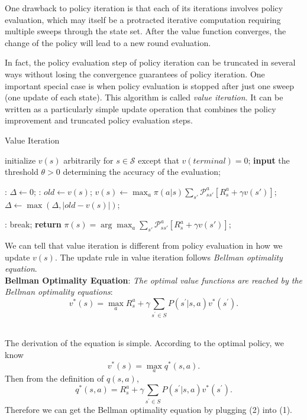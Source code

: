 \documentclass{progartcn}
\begin{document}
		One drawback to policy iteration is that each of its iterations involves policy evaluation, which may itself be a protracted iterative computation requiring multiple sweeps through the state set. After the value function converges, the change of the policy will lead to a new round evaluation.

		In fact, the policy evaluation step of policy iteration can be truncated in several ways without losing the convergence guarantees of policy iteration. One important special case is when policy evaluation is stopped after just one sweep (one update of each state). This algorithm is called \textit{value iteration}. It can be written as a particularly simple update operation that combines the policy improvement and truncated policy evaluation steps.

		\begin{algorithm}[H]
		\caption{Value Iteration}
		\label{alg: Value Iteration}
		\begin{algorithmic}[1]
		\State initialize $v(s)$ arbitrarily for $s\in\mathcal{S}$ except that $v(terminal)=0$;
        \State \textbf{input} the threshold $\theta>0$ determining the accuracy of the evaluation; 
        
        :
        	\State $\Delta\gets 0$;
        	:
        		\State $old\gets v(s)$;
        		\State $v(s)\gets\max_{a}\pi(a|s)\sum_{s'}\mathcal{P}_{ss'}^a[R_s^a+\gamma v(s')]$;
        		\State $\Delta\gets\max(\Delta,|old-v(s)|)$;
        	\EndFor

        	\If {$\Delta<\theta$}:
        	\State break;
        	\EndIf
        \EndFor
        \State \textbf{return} $\pi(s)=\arg\max_a\sum_{s'}\mathcal{P}_{ss'}^a[R_s^a+\gamma v(s')]$;
        \end{algorithmic}
        \end{algorithm}

        We can tell that value iteration is different from policy evaluation in how we update $v(s)$. The update rule in value iteration follows \textit{Bellman optimality equation}.\\

		\textbf{Bellman Optimality Equation}: \textit{The optimal value functions are reached by the Bellman optimality equations}:
		\[v^{*}(s)=\max _{a} R_s^a+\gamma \sum_{s^{\prime} \in S} P\left(s^{\prime} | s, a\right) v^{*}\left(s^{\prime}\right).\]\

		The derivation of the equation is simple. According to the optimal policy, we know
		\[v^{*}(s)=\max_a q^{*}(s, a)\tag{1}.\]
		Then from the definition of $q(s,a)$,
		\[q^{*}(s, a)=R_s^a+\gamma \sum_{s^{\prime} \in S} P\left(s^{\prime} | s, a\right) v^{*}\left(s^{\prime}\right).\tag{2}\]
		Therefore we can get the Bellman optimality equation by plugging (2) into (1).\\
\end{document}
